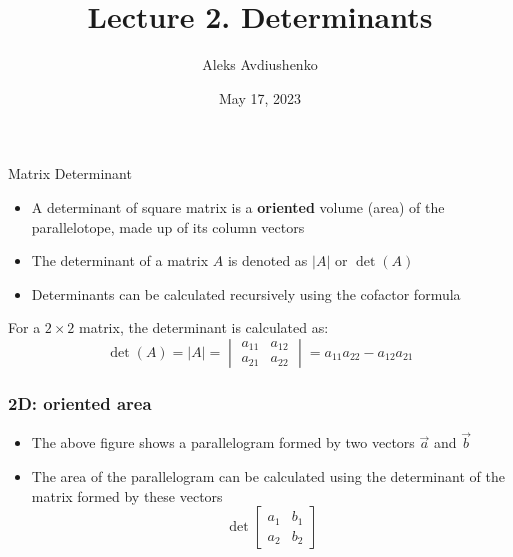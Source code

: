 \documentclass[fullscreen=true, bookmarks=true, hyperref={pdfencoding=unicode}]{beamer}
\title{Lecture 2. Determinants}
\author{Aleks Avdiushenko}
\institute{Neapolis University Paphos}
\date{May 17, 2023}
\begin{document}

\begin{frame}
\transdissolve[duration=0.2]
\titlepage
\end{frame}


\begin{frame}{Matrix Determinant}
  \begin{itemize}
    \item A determinant of square matrix is a \textbf{oriented} volume (area) of the parallelotope, made up of its column vectors
    \pause
    \item The determinant of a matrix $A$ is denoted as $|A|$ or $\det(A)$
    \pause
    \item Determinants can be calculated recursively using the cofactor formula
  \end{itemize}
  \pause
  \begin{example}
    For a $2 \times 2$ matrix, the determinant is calculated as:
    \[
      \det(A) = |A| = \begin{vmatrix}
        a_{11} & a_{12} \\
        a_{21} & a_{22}
      \end{vmatrix} = a_{11}a_{22} - a_{12}a_{21}
    \]      
  \end{example}
\end{frame}


\begin{frame}
  \frametitle{2D: oriented area}

  \begin{center}
  \end{center}
  \begin{itemize}
    \item The above figure shows a parallelogram formed by two vectors $\vec{a}$ and $\vec{b}$
    \item The area of the parallelogram can be calculated using the determinant of the matrix formed by these vectors
    \[
      \det \begin{bmatrix}
        a_{1} & b_{1} \\
        a_{2} & b_{2}
      \end{bmatrix}
    \]      
  \end{itemize}
\end{frame}
\end{document}
